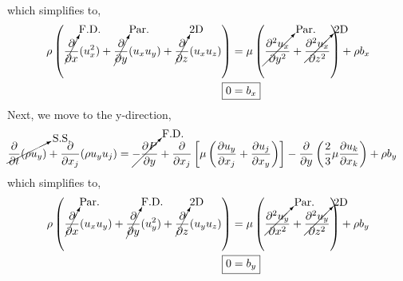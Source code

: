 which simplifies to,
\begin{align*}
    \rho \left(\cancelto{\text{F.D.}}{\frac{\partial}{\partial x}} (u_x^2) + \cancelto{\text{Par.}}{\frac{\partial}{\partial y}} (u_x u_y) + \cancelto{\text{2D}}{\frac{\partial}{\partial z}} (u_x u_z) \right) &=  \mu \left(\cancelto{\text{Par.}}{\frac{\partial^2 u_x}{\partial y^2}} + \cancelto{\text{2D}}{\frac{\partial^2 u_x}{\partial z^2}} \right) + \rho b_x \\
    \Aboxed{0 &= b_x}
\end{align*}
Next, we move to the y-direction,
\begin{align*}
    \cancelto{\text{S.S.}}{\frac{\partial}{\partial t} (\rho u_y)} + \frac{\partial}{\partial x_j} (\rho u_y u_j) &= \cancelto{\text{F.D.}}{-\frac{\partial P}{\partial y}} + \frac{\partial}{\partial x_j} \left[ \mu \left( \frac{\partial u_y}{\partial x_j} + \frac{\partial u_j}{\partial x_y} \right) \right] - \frac{\partial}{\partial y} \left(\frac{2}{3} \mu \frac{\partial u_k}{\partial x_k} \right) + \rho b_y
\end{align*}
which simplifies to,
\begin{align*}
    \rho \left(\cancelto{\text{Par.}}{\frac{\partial}{\partial x}} (u_x u_y) + \cancelto{\text{F.D.}}{\frac{\partial}{\partial y}} (u_y^2) + \cancelto{\text{2D}}{\frac{\partial}{\partial z}} (u_y u_z) \right) &=  \mu \left(\cancelto{\text{Par.}}{\frac{\partial^2 u_y}{\partial x^2}} + \cancelto{\text{2D}}{\frac{\partial^2 u_y}{\partial z^2}} \right) + \rho b_y \\
    \Aboxed{0 &= b_y}
\end{align*}

